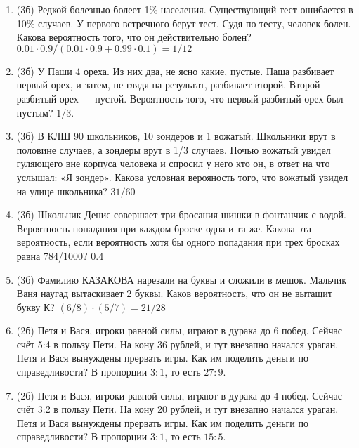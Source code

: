 \documentclass[a4paper, 12pt]{article}
\begin{document}
\begin{enumerate}
\item (3б) Редкой болезнью болеет 1\% населения. Существующий тест ошибается в 10\% случаев. У первого встречного берут тест. Судя по тесту, человек болен. Какова вероятность того, что он действительно болен? $0.01\cdot 0.9/(0.01 \cdot 0.9 + 0.99 \cdot 0.1)=1/12$
\item (3б) У Паши 4 ореха. Из них два, не ясно какие, пустые. Паша разбивает первый орех, и затем, не глядя на результат, разбивает второй. Второй разбитый орех — пустой. Вероятность того, что первый разбитый орех был пустым? $1/3$.
\item (3б) В КЛШ 90 школьников, 10 зондеров и 1 вожатый. Школьники врут
в половине случаев, а зондеры врут в 1/3 случаев. Ночью вожатый увидел
гуляющего вне корпуса человека и спросил у него кто он,
в ответ на что услышал: «Я зондер».
Какова условная верояность того, что вожатый увидел на улице школьника? $31/60$
\item (3б) Школьник Денис совершает три бросания шишки в фонтанчик с водой.
Вероятность попадания при каждом броске одна и та же.
Какова эта вероятность, если вероятность хотя бы одного попадания при трех бросках равна 784/1000? $0.4$
\item (3б) Фамилию КАЗАКОВА нарезали на буквы и сложили в мешок.
Мальчик Ваня наугад вытаскивает 2 буквы. Каков вероятность, что он не вытащит букву К? $(6/8)\cdot(5/7)=21/28$
\item (2б) Петя и Вася, игроки равной силы, играют в дурака до 6 побед. Сейчас счёт 5:4 в пользу Пети.
На кону 36 рублей, и тут внезапно начался ураган. Петя и Вася вынуждены прервать игры.
Как им поделить деньги по справедливости? В пропорции $3:1$, то есть $27:9$.
\item (2б) Петя и Вася, игроки равной силы, играют в дурака до 4 побед. Сейчас счёт 3:2 в пользу Пети.
На кону 20 рублей, и тут внезапно начался ураган. Петя и Вася вынуждены прервать игры.
Как им поделить деньги по справедливости? В пропорции $3:1$, то есть $15:5$.
\end{enumerate}
\end{document}

